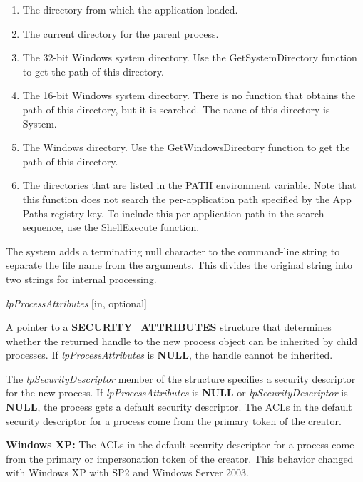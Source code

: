 \documentclass[a4paper]{book}
\newenvironment{customindent}[1]
{\begin{list}{}
	{\setlength{\leftmargin}{#1}}
    	\item[]
    }
{\end{list}}
\begin{document}
\begin{customindent}{1cm}
\begin{enumerate}
        \item The directory from which the application loaded.
        \item The current directory for the parent process.
        \item The 32-bit Windows system directory. Use the GetSystemDirectory function to get the path of this directory.
        \item The 16-bit Windows system directory. There is no function that obtains the path of this directory, but it is searched. The name of this directory is System.
        \item The Windows directory. Use the GetWindowsDirectory function to get the path of this directory.
        \item The directories that are listed in the PATH environment variable. Note that this function does not search the per-application path specified by the App Paths registry key. To include this per-application path in the search sequence, use the ShellExecute function.
\end{enumerate}

    The system adds a terminating null character to the command-line string to separate the file name from the arguments. This divides the original string into two strings for internal processing.
\end{customindent}

\noindent \textit{lpProcessAttributes} [in, optional]
\begin{customindent}{1cm}
    A pointer to a \textbf{SECURITY\_ATTRIBUTES} structure that determines whether the returned handle to the new process object can be inherited by child processes. If \textit{lpProcessAttributes} is \textbf{NULL}, the handle cannot be inherited.

    The \textit{lpSecurityDescriptor} member of the structure specifies a security descriptor for the new process. If \textit{lpProcessAttributes} is \textbf{NULL} or \textit{lpSecurityDescriptor} is \textbf{NULL}, the process gets a default security descriptor. The ACLs in the default security descriptor for a process come from the primary token of the creator.

    \textbf{Windows XP:}  The ACLs in the default security descriptor for a process come from the primary or impersonation token of the creator. This behavior changed with Windows XP with SP2 and Windows Server 2003.
\end{customindent}
\end{document}
